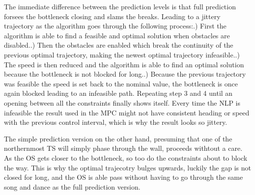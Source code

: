 The immediate difference between the prediction levels is that full prediction forsees the bottleneck closing and slams the breaks.
Leading to a jittery trajectory as the algorithm goes through the following process:.) First the algorithm is able to find a feasible and optimal solution when obstacles are disabled..) Then the obstacles are enabled which break the continuity of the previous optimal trajectory, making the newest optimal trajectory infeasible..) The speed is then reduced and the algorithm is able to find an optimal solution because the bottleneck is not blocked for long..) Because the previous trajectory was feasible the speed is set back to the nominal value, the bottleneck is once again blocked leading to an infeasible path.\newline
Repeating step 3 and 4 until an opening between all the constraints finally shows itself. Every time the \gls{NLP} is infeasible the result used in the MPC
might not have consistent heading or speed with the previous control interval, which is why the result looks so jittery.

The simple prediction version on the other hand, presuming that one of the northernmost TS will simply phase through the wall, proceeds withtout a care.
As the \gls{OS} gets closer to the bottleneck, so too do the constraints about to block the way. This is why the optimal trajecotry bulges upwards, luckily the gap is not
closed for long, and the OS is able pass without having to go through the same song and dance as the full prediction version.

